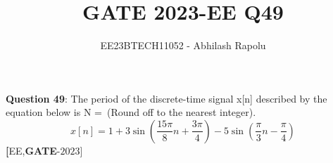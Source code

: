 \documentclass[journal,12pt,twocolumn]{IEEEtran}
\title{GATE 2023-EE Q49}
\author{EE23BTECH11052 - Abhilash Rapolu 
}
\begin{document}
\maketitle
\newpage
\bigskip
\textbf{Question 49}: The period of the discrete-time signal x[n] described by the equation below is N =\ (Round off to the nearest integer).
$$x[n] = 1 + 3\sin\left(\frac{15\pi}{8}n + \frac{3\pi}{4}\right) - 5\sin\left(\frac{\pi}{3}n - \frac{\pi}{4}\right)$$
\hfill \textbf[{EE},\textbf{GATE}-$2023$]
\end{document}
